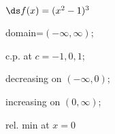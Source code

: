 {$\ds f(x) =(x^2-1)^3$
}
{domain=$(-\infty,\infty)$;

c.p. at $c=-1,0,1$;

decreasing on $(-\infty,0)$;

increasing on $(0,\infty)$;

rel. min at $x=0$
}

